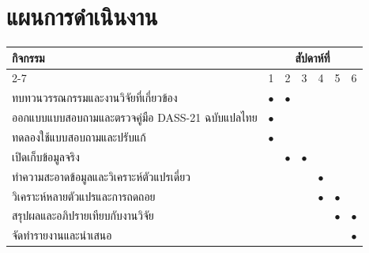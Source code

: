 \section{แผนการดำเนินงาน}


\begin{table}[H]
    \centering
    \begin{tabular}{|p{7cm}|c|c|c|c|c|c|}
        \hline
        \multirow{2}{*}{\centering กิจกรรม} & \multicolumn{6}{c|}{สัปดาห์ที่} \\
        \cline{2-7}
                                            & 1 & 2 & 3 & 4 & 5 & 6 \\
        \hline
        ทบทวนวรรณกรรมและงานวิจัยที่เกี่ยวข้อง & $\bullet$ & $\bullet$ & & & & \\
        \hline
        ออกแบบแบบสอบถามและตรวจคู่มือ DASS-21 ฉบับแปลไทย & $\bullet$ & & & & & \\
        \hline
        ทดลองใช้แบบสอบถามและปรับแก้ & $\bullet$ & & & & & \\
        \hline
        เปิดเก็บข้อมูลจริง & & $\bullet$ & $\bullet$ & & & \\
        \hline
        ทำความสะอาดข้อมูลและวิเคราะห์ตัวแปรเดี่ยว & & & & $\bullet$ & & \\
        \hline
        วิเคราะห์หลายตัวแปรและการถดถอย & & & & $\bullet$ & $\bullet$ & \\
        \hline
        สรุปผลและอภิปรายเทียบกับงานวิจัย & & & & & $\bullet$ & $\bullet$ \\
        \hline
        จัดทำรายงานและนำเสนอ & & & & & & $\bullet$ \\
        \hline
    \end{tabular}
\end{table}

